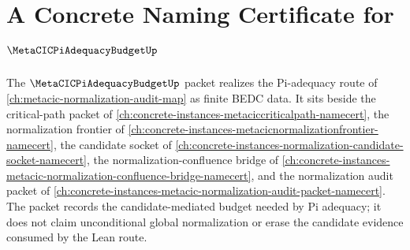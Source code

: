\chapter{A Concrete Naming Certificate for $\MetaCICPiAdequacyBudgetUp$}
\label{ch:concrete-instances-metacic-pi-adequacy-budget-namecert}

The $\MetaCICPiAdequacyBudgetUp$ packet realizes the Pi-adequacy route of \autoref{ch:metacic-normalization-audit-map} as finite BEDC data. It sits beside the critical-path packet of \autoref{ch:concrete-instances-metaciccriticalpath-namecert}, the normalization frontier of \autoref{ch:concrete-instances-metacicnormalizationfrontier-namecert}, the candidate socket of \autoref{ch:concrete-instances-normalization-candidate-socket-namecert}, the normalization-confluence bridge of \autoref{ch:concrete-instances-metacic-normalization-confluence-bridge-namecert}, and the normalization audit packet of \autoref{ch:concrete-instances-metacic-normalization-audit-packet-namecert}. The packet records the candidate-mediated budget needed by Pi adequacy; it does not claim unconditional global normalization or erase the candidate evidence consumed by the Lean route.

